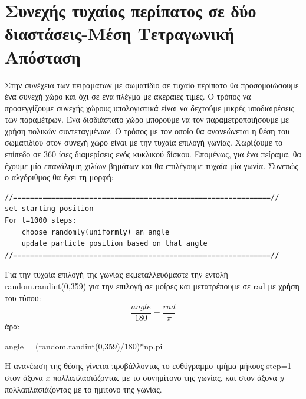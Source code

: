 \section{Συνεχής τυχαίος περίπατος σε δύο διαστάσεις-Μέση Τετραγωνική Απόσταση}
Στην συνέχεια των πειραμάτων με σωματίδιο σε τυχαίο περίπατο θα προσομοιώσουμε ένα συνεχή χώρο και όχι σε ένα πλέγμα με ακέραιες τιμές. Ο τρόπος να προσεγγίζουμε συνεχής χώρους υπολογιστικά είναι να δεχτούμε μικρές υποδιαιρέσεις των παραμέτρων. Ένα δισδιάστατο χώρο μπορούμε να τον παραμετροποιήσουμε με χρήση πολικών συντεταγμένων. Ο τρόπος με τον οποίο θα ανανεώνεται η θέση του σωματιδίου στον συνεχή χώρο είναι με την τυχαία επιλογή γωνίας. Χωρίζουμε το επίπεδο σε 360 ίσες διαμερίσεις ενός κυκλικού δίσκου. Επομένως, για ένα πείραμα, θα έχουμε μία επανάληψη χιλίων βημάτων και θα επιλέγουμε τυχαία μία γωνία. Συνεπώς ο αλγόριθμος θα έχει τη μορφή:
\en
\begin{lstlisting}
//=============================================================//
set starting position 
For t=1000 steps:
    choose randomly(uniformly) an angle 
    update particle position based on that angle
//=============================================================//
\end{lstlisting}
\gr 
{}
Για την τυχαία επιλογή της γωνίας εκμεταλλευόμαστε την εντολή { \en random.randint(0,359)} για την επιλογή σε μοίρες και μετατρέπουμε σε {\en rad} με χρήση του τύπου: 
\begin{equation}
\frac{angle}{180}=\frac{rad}{\pi}
\end{equation}
άρα:
\en
\begin{python}
angle = (random.randint(0,359)/180)*np.pi
\end{python}
\gr 
Η ανανέωση της θέσης γίνεται προβάλλοντας το ευθύγραμμο τμήμα μήκους {\en step}=1 στον άξονα $x$ πολλαπλασιάζοντας με το συνημίτονο της γωνίας, και στον άξονα $y$ πολλαπλασιάζοντας με το ημίτονο της γωνίας.

